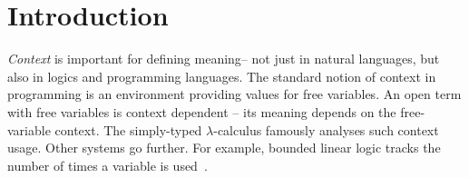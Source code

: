 \newcommand{\C}{ {\textcolor{cclr}{\mathcal{C}}} }
\newcommand{\czero}{ \textcolor{cclr}{ \mathsf{ign} } }
\newcommand{\cunit}{ \textcolor{cclr}{ \mathsf{use} } }
\newcommand{\cseq}{ \textcolor{cclr}{ \circledast }} %
\newcommand{\cpar}{ \textcolor{cclr}{\oplus} }
\newcommand{\cleq}{ \textcolor{cclr}{\leq} }


\newcommand{\uncurry}{\Lambda^{\hspace{-0.2em}-1}}

\newcommand{\sclrd}[1]{ \textcolor{sclr}{#1} }

\newcommand{\SH}{ {\textcolor{sclr}{\mathcal{S}}} }
\newcommand{\sempty}{ {\textcolor{sclr}{ \hat{0}}} }
\renewcommand{\sunit}{ {\textcolor{sclr}{\hat{1}}} }
\newcommand{\stimes}{ {\textcolor{sclr}{\diamond}} }

\newcommand{\sflat}{\star}

\newcommand{\aclrd}[1]{ \textcolor{aclr}{#1} }

\newcommand{\mksh}[1]{{\sclrd{[}#1\sclrd{]}}}

\newcommand{\amerge}{ \textcolor{aclr}{ \mathbin{\rotatebox[origin=c]{-90}{$\ltimes$}} } }
\newcommand{\asplit}{ \textcolor{aclr}{ \mathbin{\rotatebox[origin=c]{90}{$\ltimes$}} } }
\newcommand{\aseq}{ \textcolor{aclr}{\circledast}} %
\newcommand{\alift}[1]{ \textcolor{aclr}{\langle} #1 \textcolor{aclr}{\rangle}} 
\newcommand{\azero}{ \textcolor{aclr}{\bot} }
\newcommand{\aunit}{ \alift{\cunit} } %
\newcommand{\aweak}{ \alift{\czero} } %

\newcommand{\fcons}{ \times } 
\newcommand{\fempty}{\epsilon}



\section{Introduction}

\emph{Context} is important for defining meaning-- not just in natural languages, but also in logics and 
programming languages.
The standard notion of context in programming is an environment 
providing values for free variables. An open term with free variables is context dependent -- its 
meaning depends on the free-variable context. The simply-typed $\lambda$-calculus famously 
analyses such context usage. 
Other systems go further. %
For example, bounded linear logic tracks the number of times a 
variable is used~\cite{girard1992bounded}.

